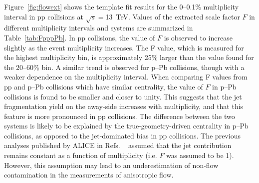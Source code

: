 Figure~\ref{fig:flowext} shows the template fit results for the 0--0.1\% multiplicity interval in pp collisions at $\sqrt{s} = $13~TeV. Values of the extracted scale factor $F$ in different multiplicity intervals and systems are summarized in Table~\ref{tab:FpppPb}. In pp collisions, the value of $F$ is observed to increase slightly as the event multiplicity increases. The F value, which is measured for the highest multiplicity bin, is approximately 25\% larger than the value found for the 20–60\% bin. A similar trend is observed for p--Pb collisions, though with a weaker dependence on the multiplicity interval. When comparing F values from pp and p–Pb collisions which have similar centrality, the value of $F$ in p--Pb collisions is found to be smaller and closer to unity.
This suggests that the jet fragmentation yield on the away-side increases with multiplicity, and that this feature is more pronounced in pp collisions. The difference between the two systems is likely to be explained by the true-geometry-driven centrality in p--Pb collisions, as opposed to the jet-dominated bias in pp collisions.
The previous analyses published by ALICE in Refs. ~\cite{ALICE:2012eyl,ALICE:2013snk} assumed that the jet contribution remains constant as a function of multiplicity (i.e. $F$ was assumed to be 1). However, this assumption may lead to an underestimation of non-flow contamination in the measurements of anisotropic flow.
\begin{table}[!b]
\caption{The scale factor $F$ for various multiplicity intervals is shown for pp collisions (top) and p--Pb collisions (bottom), with 1~$<\it{p}{\rm{T,trig}}<$~2~GeV/$c$ and 1~$<\it{p}{\rm{T,assoc}}<$~4~GeV/$c$. Note that only statistical uncertainties are reported in the table. The systematic uncertainty for $F$ is 3.8\%, which is the same for both collision systems and multiplicity intervals.}
\centering
{}
\label{tab:FpppPb}
\end{table}


